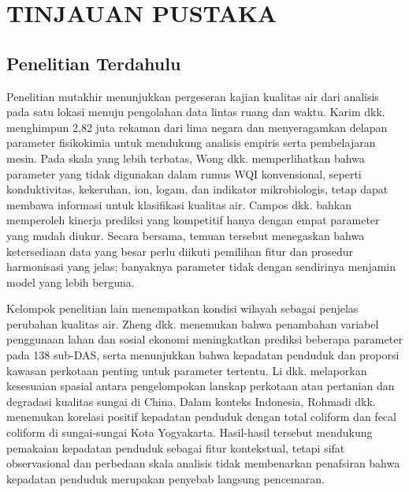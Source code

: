 \chapter{TINJAUAN PUSTAKA}

\section{Penelitian Terdahulu}

Penelitian mutakhir menunjukkan pergeseran kajian kualitas air dari analisis pada satu lokasi menuju pengolahan data lintas ruang dan waktu. Karim dkk. \cite{karim_comprehensive_2025} menghimpun 2,82 juta rekaman dari lima negara dan menyeragamkan delapan parameter fisikokimia untuk mendukung analisis empiris serta pembelajaran mesin. Pada skala yang lebih terbatas, Wong dkk. \cite{wong_water_2022} memperlihatkan bahwa parameter yang tidak digunakan dalam rumus WQI konvensional, seperti konduktivitas, kekeruhan, ion, logam, dan indikator mikrobiologis, tetap dapat membawa informasi untuk klasifikasi kualitas air. Campos dkk. \cite{campos_automated_2026} bahkan memperoleh kinerja prediksi yang kompetitif hanya dengan empat parameter yang mudah diukur. Secara bersama, temuan tersebut menegaskan bahwa ketersediaan data yang besar perlu diikuti pemilihan fitur dan prosedur harmonisasi yang jelas; banyaknya parameter tidak dengan sendirinya menjamin model yang lebih berguna.

Kelompok penelitian lain menempatkan kondisi wilayah sebagai penjelas perubahan kualitas air. Zheng dkk. \cite{zheng_large_2023} menemukan bahwa penambahan variabel penggunaan lahan dan sosial ekonomi meningkatkan prediksi beberapa parameter pada 138 sub-DAS, serta menunjukkan bahwa kepadatan penduduk dan proporsi kawasan perkotaan penting untuk parameter tertentu. Li dkk. \cite{li_urbanization_2023} melaporkan kesesuaian spasial antara pengelompokan lanskap perkotaan atau pertanian dan degradasi kualitas sungai di China. Dalam konteks Indonesia, Rohmadi dkk. \cite{rohmadi_impact_2022} menemukan korelasi positif kepadatan penduduk dengan total coliform dan fecal coliform di sungai-sungai Kota Yogyakarta. Hasil-hasil tersebut mendukung pemakaian kepadatan penduduk sebagai fitur kontekstual, tetapi sifat observasional dan perbedaan skala analisis tidak membenarkan penafsiran bahwa kepadatan penduduk merupakan penyebab langsung pencemaran.

